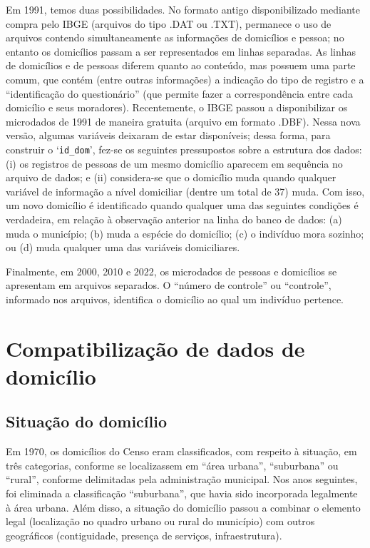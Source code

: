 \documentclass[12pt,a4paper]{article}
\newcommand{\vr}[1]{\texttt{#1}}
\begin{document}
Em 1991, temos duas possibilidades. No formato antigo disponibilizado mediante compra pelo IBGE (arquivos do tipo .DAT ou .TXT), permanece o uso de arquivos contendo simultaneamente as informações de domicílios e pessoa; no entanto os domicílios passam a ser representados em linhas separadas. As linhas de domicílios e de pessoas diferem quanto ao conteúdo, mas possuem uma parte comum, que contém (entre outras informações) a indicação do tipo de registro e a “identificação do questionário” (que permite fazer a correspondência entre cada domicílio e seus moradores). Recentemente, o IBGE passou a disponibilizar os microdados de 1991 de maneira gratuita (arquivo em formato .DBF). Nessa nova versão, algumas variáveis deixaram de estar disponíveis; dessa forma, para construir o ‘\vr{id\_dom}’, fez-se os seguintes pressupostos sobre a estrutura dos dados: (i) os registros de pessoas de um mesmo domicílio aparecem em sequência no arquivo de dados; e (ii) considera-se que o domicílio muda quando qualquer variável de informação a nível domiciliar (dentre um total de 37) muda. Com isso, um novo domicílio é identificado quando qualquer uma das seguintes condições é verdadeira, em relação à observação anterior na linha do banco de dados: (a) muda o município; (b) muda a espécie do domicílio; (c) o indivíduo mora sozinho; ou (d) muda qualquer uma das variáveis domiciliares.

Finalmente, em 2000, 2010 e 2022, os microdados de pessoas e domicílios se apresentam em arquivos separados. O “número de controle” ou “controle”, informado nos arquivos, identifica o domicílio ao qual um indivíduo pertence.

\section{Compatibilização de dados de domicílio}

\subsection{Situação do domicílio}\label{sec:c1}
Em 1970, os domicílios do Censo eram classificados, com respeito à situação, em três categorias, conforme se localizassem em “área urbana”, “suburbana” ou “rural”, conforme delimitadas pela administração municipal. Nos anos seguintes, foi eliminada a classificação “suburbana”, que havia sido incorporada legalmente à área urbana. Além disso, a situação do domicílio passou a combinar o elemento legal (localização no quadro urbano ou rural do município) com outros geográficos (contiguidade, presença de serviços, infraestrutura).
\end{document}
